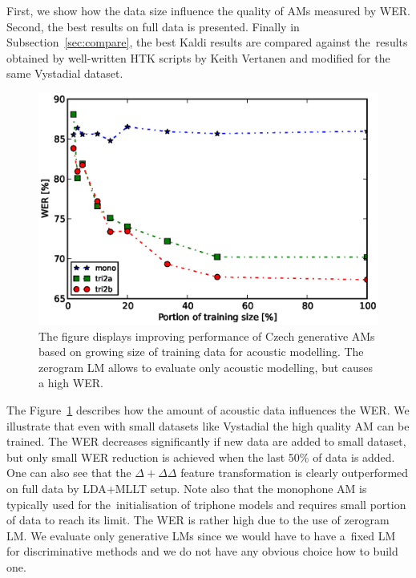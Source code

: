 First, we show how the data size influence the quality of \acp{AM} measured by \ac{WER}.
Second,  the best results on full data is presented.
Finally in Subsection~\ref{sec:compare}, the best Kaldi results are compared against the~results obtained by well-written \ac{HTK} scripts by Keith Vertanen and modified for the same Vystadial dataset\cite{korvas_2014}.

\begin{figure}[!htp]
    \begin{center}
    \includegraphics[scale=0.7]{images/partial-zerogram.ps}
    \caption{The figure displays improving performance of Czech generative \acp{AM} based on growing size of training data for acoustic modelling. The zerogram \acs{LM} allows to evaluate only acoustic modelling, but causes a high \acs{WER}. }
    \label{fig:partials} 
    \end{center}
\end{figure}

The Figure~\ref{fig:partials} describes how the amount of acoustic data influences the \ac{WER}.
We illustrate that even with small datasets like Vystadial the high quality \ac{AM} can be trained.
The WER decreases significantly if new data are added to small dataset, but only small \ac{WER} reduction is achieved when the last 50\% of data is added.
One can also see that the $\Delta+\Delta\Delta$ feature transformation is clearly outperformed on full data by \ac{LDA}+\ac{MLLT} setup.
Note also that the monophone \ac{AM} is typically used for the~initialisation of triphone models and requires small portion of data to reach its limit.
The WER is rather high due to the use of zerogram \ac{LM}.
We evaluate only generative \acp{LM} since we would have to have a~fixed LM for discriminative methods and we do not have any obvious choice how to build one.

